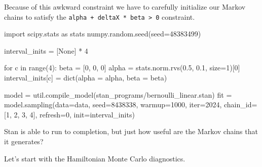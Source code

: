 \documentclass[
  letterpaper,
  DIV=11,
  numbers=noendperiod]{scrartcl}
\newenvironment{Shaded}{\begin{snugshade}}{\end{snugshade}}
\newcommand{\BuiltInTok}[1]{\textcolor[rgb]{0.00,0.23,0.31}{#1}}
\newcommand{\ControlFlowTok}[1]{\textcolor[rgb]{0.00,0.23,0.31}{#1}}
\newcommand{\DecValTok}[1]{\textcolor[rgb]{0.68,0.00,0.00}{#1}}
\newcommand{\FloatTok}[1]{\textcolor[rgb]{0.68,0.00,0.00}{#1}}
\newcommand{\ImportTok}[1]{\textcolor[rgb]{0.00,0.46,0.62}{#1}}
\newcommand{\KeywordTok}[1]{\textcolor[rgb]{0.00,0.23,0.31}{#1}}
\newcommand{\NormalTok}[1]{\textcolor[rgb]{0.00,0.23,0.31}{#1}}
\newcommand{\OperatorTok}[1]{\textcolor[rgb]{0.37,0.37,0.37}{#1}}
\newcommand{\StringTok}[1]{\textcolor[rgb]{0.13,0.47,0.30}{#1}}
\newcommand{\VariableTok}[1]{\textcolor[rgb]{0.07,0.07,0.07}{#1}}
\begin{document}
Because of this awkward constraint we have to carefully initialize our
Markov chains to satisfy the
\texttt{alpha\ +\ deltaX\ *\ beta\ \textgreater{}\ 0} constraint.

\begin{Shaded}
\begin{Highlighting}[]
\ImportTok{import}\NormalTok{ scipy.stats }\ImportTok{as}\NormalTok{ stats}
\NormalTok{numpy.random.seed(seed}\OperatorTok{=}\DecValTok{48383499}\NormalTok{)}

\NormalTok{interval\_inits }\OperatorTok{=}\NormalTok{ [}\VariableTok{None}\NormalTok{] }\OperatorTok{*} \DecValTok{4}

\ControlFlowTok{for}\NormalTok{ c }\KeywordTok{in} \BuiltInTok{range}\NormalTok{(}\DecValTok{4}\NormalTok{):}
\NormalTok{  beta }\OperatorTok{=}\NormalTok{ [}\DecValTok{0}\NormalTok{, }\DecValTok{0}\NormalTok{, }\DecValTok{0}\NormalTok{]}
\NormalTok{  alpha }\OperatorTok{=}\NormalTok{ stats.norm.rvs(}\FloatTok{0.5}\NormalTok{, }\FloatTok{0.1}\NormalTok{, size}\OperatorTok{=}\DecValTok{1}\NormalTok{)[}\DecValTok{0}\NormalTok{]}
\NormalTok{  interval\_inits[c] }\OperatorTok{=} \BuiltInTok{dict}\NormalTok{(alpha }\OperatorTok{=}\NormalTok{ alpha, beta }\OperatorTok{=}\NormalTok{ beta)}
\end{Highlighting}
\end{Shaded}

\begin{Shaded}
\begin{Highlighting}[]
\NormalTok{model }\OperatorTok{=}\NormalTok{ util.compile\_model(}\StringTok{\textquotesingle{}stan\_programs/bernoulli\_linear.stan\textquotesingle{}}\NormalTok{)}
\NormalTok{fit }\OperatorTok{=}\NormalTok{ model.sampling(data}\OperatorTok{=}\NormalTok{data, seed}\OperatorTok{=}\DecValTok{8438338}\NormalTok{, warmup}\OperatorTok{=}\DecValTok{1000}\NormalTok{, }\BuiltInTok{iter}\OperatorTok{=}\DecValTok{2024}\NormalTok{,}
\NormalTok{                     chain\_id}\OperatorTok{=}\NormalTok{[}\DecValTok{1}\NormalTok{, }\DecValTok{2}\NormalTok{, }\DecValTok{3}\NormalTok{, }\DecValTok{4}\NormalTok{], refresh}\OperatorTok{=}\DecValTok{0}\NormalTok{, }
\NormalTok{                     init}\OperatorTok{=}\NormalTok{interval\_inits)}
\end{Highlighting}
\end{Shaded}

Stan is able to run to completion, but just how useful are the Markov
chains that it generates?

Let's start with the Hamiltonian Monte Carlo diagnostics.
\end{document}
